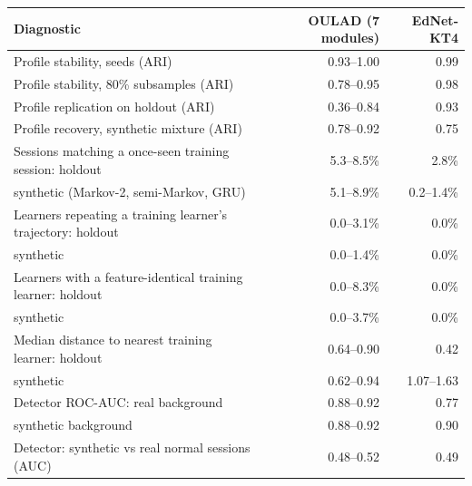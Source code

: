 \begin{tabular}{l r r }
\toprule
Diagnostic & OULAD (7 modules) & EdNet-KT4 \\
\midrule
Profile stability, seeds (ARI) & 0.93--1.00 & 0.99 \\
Profile stability, 80\% subsamples (ARI) & 0.78--0.95 & 0.98 \\
Profile replication on holdout (ARI) & 0.36--0.84 & 0.93 \\
Profile recovery, synthetic mixture (ARI) & 0.78--0.92 & 0.75 \\
Sessions matching a once-seen training session: holdout & 5.3--8.5\% & 2.8\% \\
\quad synthetic (Markov-2, semi-Markov, GRU) & 5.1--8.9\% & 0.2--1.4\% \\
Learners repeating a training learner's trajectory: holdout & 0.0--3.1\% & 0.0\% \\
\quad synthetic & 0.0--1.4\% & 0.0\% \\
Learners with a feature-identical training learner: holdout & 0.0--8.3\% & 0.0\% \\
\quad synthetic & 0.0--3.7\% & 0.0\% \\
Median distance to nearest training learner: holdout & 0.64--0.90 & 0.42 \\
\quad synthetic & 0.62--0.94 & 1.07--1.63 \\
Detector ROC-AUC: real background & 0.88--0.92 & 0.77 \\
\quad synthetic background & 0.88--0.92 & 0.90 \\
Detector: synthetic vs real normal sessions (AUC) & 0.48--0.52 & 0.49 \\
\bottomrule
\end{tabular}
